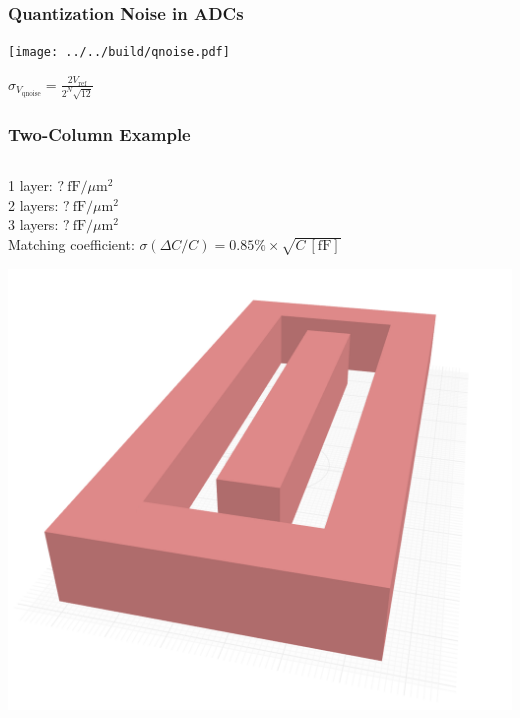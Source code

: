 \documentclass[aspectratio=169]{beamer}
\begin{document}
\begin{frame}
  \frametitle{Quantization Noise in ADCs}
  \begin{center}
    \texttt{[image: ../../build/qnoise.pdf]}
    \vspace{1em}

    $\displaystyle \sigma_{V_{\mathrm{qnoise}}} = \frac{2 V_\mathrm{ref}}{2^N \sqrt{12}}$
  \end{center}
\end{frame}

\begin{frame}
  \frametitle{Two-Column Example}

  \begin{columns}
    \begin{column}{0.5\textwidth}
      1 layer: $?~\mathrm{fF}/\mu\mathrm{m}^2$ \\
      2 layers: $?~\mathrm{fF}/\mu\mathrm{m}^2$ \\
      3 layers: $?~\mathrm{fF}/\mu\mathrm{m}^2$ \\
      Matching coefficient: $\sigma(\Delta C/C) = 0.85\% \times \sqrt{C~[\mathrm{fF}]}$
      \vspace{2em}
      \begin{center}
        \includegraphics[width=\linewidth,height=0.4\textheight,keepaspectratio]{../images/cdac_unit_cell_3d.png}
      \end{center}
    \end{column}


\end{columns}
\end{frame}
\end{document}
